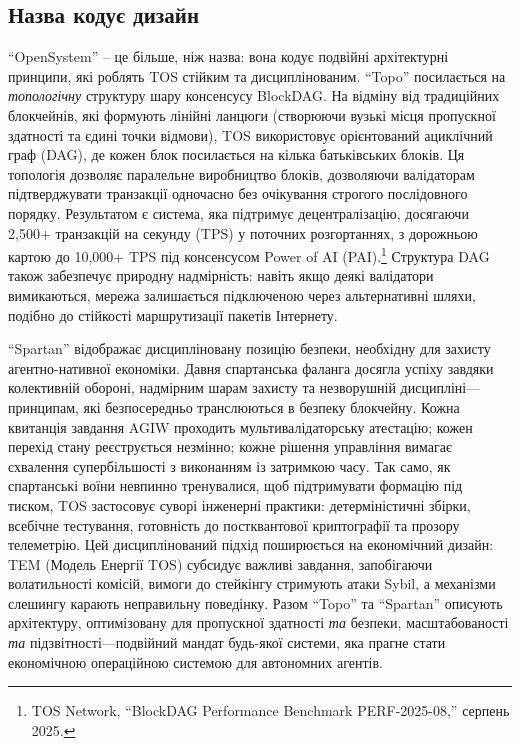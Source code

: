 \documentclass[11pt]{article}
\begin{document}
\subsection{Назва кодує дизайн}
``OpenSystem'' -- це більше, ніж назва: вона кодує подвійні архітектурні принципи, які роблять TOS стійким та дисциплінованим. ``Topo'' посилається на \emph{топологічну} структуру шару консенсусу BlockDAG. На відміну від традиційних блокчейнів, які формують лінійні ланцюги (створюючи вузькі місця пропускної здатності та єдині точки відмови), TOS використовує орієнтований ациклічний граф (DAG), де кожен блок посилається на кілька батьківських блоків. Ця топологія дозволяє паралельне виробництво блоків, дозволяючи валідаторам підтверджувати транзакції одночасно без очікування строгого послідовного порядку. Результатом є система, яка підтримує децентралізацію, досягаючи 2,500+ транзакцій на секунду (TPS) у поточних розгортаннях, з дорожньою картою до 10,000+ TPS під консенсусом Power of AI (PAI).\footnote{TOS Network, ``BlockDAG Performance Benchmark PERF-2025-08,'' серпень 2025.} Структура DAG також забезпечує природну надмірність: навіть якщо деякі валідатори вимикаються, мережа залишається підключеною через альтернативні шляхи, подібно до стійкості маршрутизації пакетів Інтернету.

``Spartan'' відображає дисципліновану позицію безпеки, необхідну для захисту агентно-нативної економіки. Давня спартанська фаланга досягла успіху завдяки колективній обороні, надмірним шарам захисту та незворушній дисципліні---принципам, які безпосередньо транслюються в безпеку блокчейну. Кожна квитанція завдання AGIW проходить мультивалідаторську атестацію; кожен перехід стану реєструється незмінно; кожне рішення управління вимагає схвалення супербільшості з виконанням із затримкою часу. Так само, як спартанські воїни невпинно тренувалися, щоб підтримувати формацію під тиском, TOS застосовує суворі інженерні практики: детерміністичні збірки, всебічне тестування, готовність до постквантової криптографії та прозору телеметрію. Цей дисциплінований підхід поширюється на економічний дизайн: TEM (Модель Енергії TOS) субсидує важливі завдання, запобігаючи волатильності комісій, вимоги до стейкінгу стримують атаки Sybil, а механізми слешингу карають неправильну поведінку. Разом ``Topo'' та ``Spartan'' описують архітектуру, оптимізовану для пропускної здатності \emph{та} безпеки, масштабованості \emph{та} підзвітності---подвійний мандат будь-якої системи, яка прагне стати економічною операційною системою для автономних агентів.
\end{document}
